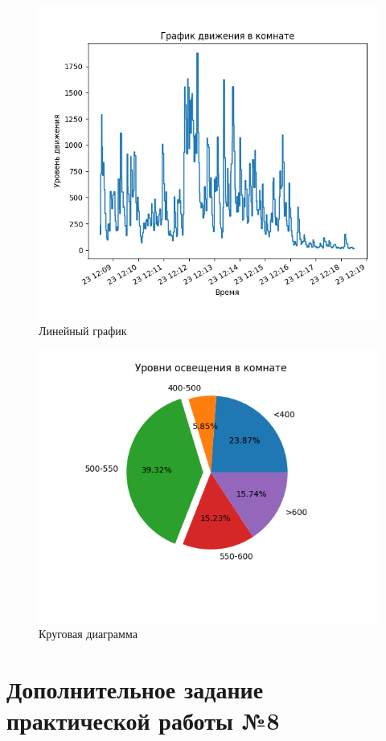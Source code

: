 \documentclass[a4paper,14pt]{extarticle}
\begin{document}
\begin{problem}
\begin{figure}[h!]
	\centering
	\includegraphics[width=0.7\linewidth]{images/main8-motion}
	\caption{Линейный график}
	\label{fig:main8-motion}
\end{figure}

\begin{figure}[h!]
	\centering
	\includegraphics[width=0.8\linewidth]{images/main8-illumination}
	\caption{Круговая диаграмма }
	\label{fig:main8-illumination}
\end{figure}
	
\end{problem}

\newpage
\section{Дополнительное задание\\практической работы №8}
\end{document}

